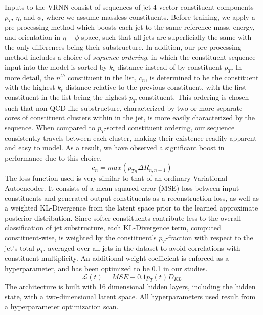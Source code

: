 \documentclass[letterpaper,11pt]{article}
\begin{document}
Inputs to the VRNN consist of sequences of jet 4-vector constituent components $p_{T}$, $\eta$, and $\phi$, where we assume massless constituents. Before training, we apply a pre-processing method which boosts each jet to the same reference mass, energy, and orientation in $\eta-\phi$ space, such that all jets are superficially the same with the only differences being their substructure. In addition, our pre-processing method includes a choice of \textit{sequence ordering}, in which the constituent sequence input into the model is sorted by $k_{t}$-distance instead of by constituent $p_{T}$. In more detail, the $n^{th}$ constituent in the list, $c_{n}$, is determined to be the constituent with the highest $k_{t}$-distance relative to the previous constituent, with the first constituent in the list being the highest $p_{T}$ constituent. This ordering is chosen such that non QCD-like substructure, characterized by two or more separate cores of constituent clusters within in the jet, is more easily characterized by the sequence. When compared to $p_{T}$-sorted constituent ordering, our sequence consistently travels between each cluster, making their existence readily apparent and easy to model. As a result, we have observed a significant boost in performance due to this choice.
\begin{equation}
c_{n} = max(p_{Tn}\Delta R_{n, n-1})
\end{equation}
The loss function used is very similar to that of an ordinary Variational Autoencoder. It consists of a mean-squared-error (MSE) loss between input constituents and generated output constituents as a reconstruction loss, as well as a weighted KL-Divergence from the latent space prior to the learned approximate posterior distribution. Since softer constituents contribute less to the overall classification of jet substructure, each KL-Divergence term, computed constituent-wise, is weighted by the constituent's $p_{T}$-fraction with respect to the jet's total $p_{T}$, averaged over all jets in the dataset to avoid correlations with constituent multiplicity. An additional weight coefficient is enforced as a hyperparameter, and has been optimized to be 0.1 in our studies. 
\begin{equation}
\mathcal{L}(t)=MSE+0.1\overline{p_T}(t)D_{KL}
\end{equation}
The architecture is built with 16 dimensional hidden layers, including the hidden state, with a two-dimensional latent space. All hyperparameters used result from a hyperparameter optimization scan. 
\end{document}
